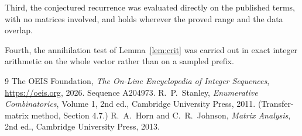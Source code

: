 \documentclass[11pt,a4paper]{article}
\theoremstyle{plain}
\theoremstyle{definition}
\begin{document}
Third, the conjectured recurrence was evaluated directly on the published terms, with no
matrices involved, and holds wherever the proved range and the data overlap.

Fourth, the annihilation test of Lemma~\ref{lem:crit} was carried out in exact integer
arithmetic on the whole vector rather than on a sampled prefix.

\begin{thebibliography}{9}
 The OEIS Foundation, \emph{The On-Line Encyclopedia of Integer
Sequences}, \url{https://oeis.org}, 2026. Sequence A204973.
 R.~P.~Stanley, \emph{Enumerative Combinatorics}, Volume 1, 2nd ed.,
Cambridge University Press, 2011. (Transfer-matrix method, Section 4.7.)
 R.~A.~Horn and C.~R.~Johnson, \emph{Matrix Analysis}, 2nd ed., Cambridge
University Press, 2013.
\end{thebibliography}
\end{document}
